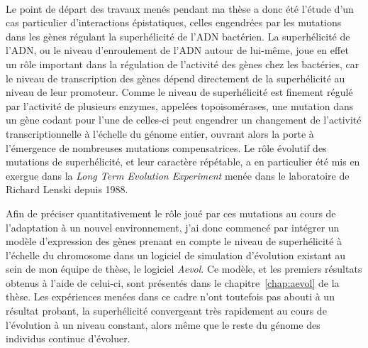 \paragraph{}
Le point de départ des travaux menés pendant ma thèse a donc été l'étude d'un cas particulier d'interactions épistatiques, celles engendrées par les mutations dans les gènes régulant la superhélicité de l'ADN bactérien.
La superhélicité de l'ADN, ou le niveau d'enroulement de l'ADN autour de lui-même, joue en effet un rôle important dans la régulation de l'activité des gènes chez les bactéries, car le niveau de transcription des gènes dépend directement de la superhélicité au niveau de leur promoteur.
Comme le niveau de superhélicité est finement régulé par l'activité de plusieurs enzymes, appelées topoisomérases, une mutation dans un gène codant pour l'une de celles-ci peut engendrer un changement de l'activité transcriptionnelle à l'échelle du génome entier,
ouvrant alors la porte à l'émergence de nombreuses mutations compensatrices.
Le rôle évolutif des mutations de superhélicité, et leur caractère répétable, a en particulier été mis en exergue dans la \emph{Long Term Evolution Experiment} menée dans le laboratoire de Richard Lenski depuis 1988.

Afin de préciser quantitativement le rôle joué par ces mutations au cours de l'adaptation à un nouvel environnement, j'ai donc commencé par intégrer un modèle d'expression des gènes prenant en compte le niveau de superhélicité à l'échelle du chromosome dans un logiciel de simulation d'évolution existant au sein de mon équipe de thèse, le logiciel \emph{Aevol}.
Ce modèle, et les premiers résultats obtenus à l'aide de celui-ci, sont présentés dans le chapitre~\ref{chap:aevol} de la thèse.
Les expériences menées dans ce cadre n'ont toutefois pas abouti à un résultat probant, la superhélicité convergeant très rapidement au cours de l'évolution à un niveau constant, alors même que le reste du génome des individus continue d'évoluer.

